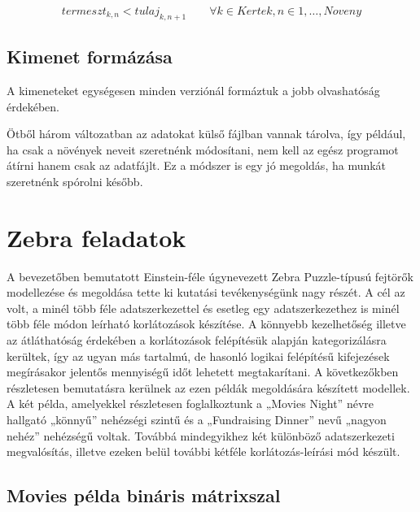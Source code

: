 \documentclass[12pt,a4paper,twoside, openright]{report}
\begin{document}
    \begin{equation}
    termeszt_{k,n} < tulaj_{k,n+1} \qquad \forall k \in Kertek, n \in 1,\dots,Noveny
	\end{equation}

\subsection{Kimenet formázása}

    A kimeneteket egységesen minden verziónál formáztuk a jobb olvashatóság érdekében.


    Ötből három változatban az adatokat külső fájlban vannak tárolva, így például, ha csak a növények neveit szeretnénk módosítani, nem kell az egész programot átírni hanem csak az adatfájlt.
    Ez a módszer is egy jó megoldás, ha munkát szeretnénk spórolni később.

\section{Zebra feladatok}

    A bevezetőben bemutatott Einstein-féle úgynevezett Zebra Puzzle-típusú fejtörők\cite{zebra} modellezése és megoldása tette ki kutatási tevékenységünk nagy részét.
    A cél az volt, a minél több féle adatszerkezettel és esetleg egy adatszerkezethez is minél több féle módon leírható korlátozások készítése.
    A könnyebb kezelhetőség illetve az átláthatóság érdekében a korlátozások felépítésük alapján kategorizálásra kerültek, így az ugyan más tartalmú, de hasonló logikai felépítésű kifejezések megírásakor jelentős mennyiségű időt lehetett megtakarítani.
    A következőkben részletesen bemutatásra kerülnek az ezen példák megoldására készített modellek.
    A két példa, amelyekkel részletesen foglalkoztunk a „Movies Night” névre hallgató „könnyű” nehézségi szintű és a „Fundraising Dinner” nevű „nagyon nehéz” nehézségű voltak.
    Továbbá mindegyikhez két különböző adatszerkezeti megvalósítás, illetve ezeken belül további kétféle korlátozás-leírási mód készült.

\subsection{Movies példa bináris mátrixszal}
\end{document}
